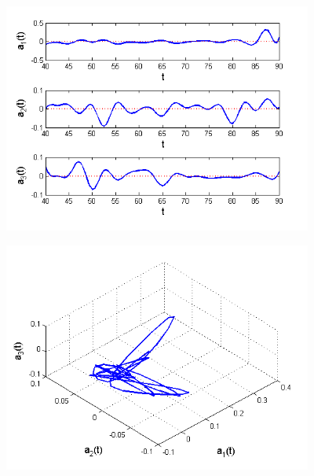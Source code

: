 \documentclass[11pt]{beamer}
\begin{document}

\begin{frame}

\begin{center}
\includegraphics[width=4in]{figs/SelTIC_Coef.png}
\end{center}

\end{frame}


\begin{frame}

\begin{center}
\includegraphics[width=4in]{figs/SelTIC_Coef3d.png}
\end{center}

\end{frame}

\end{document}
